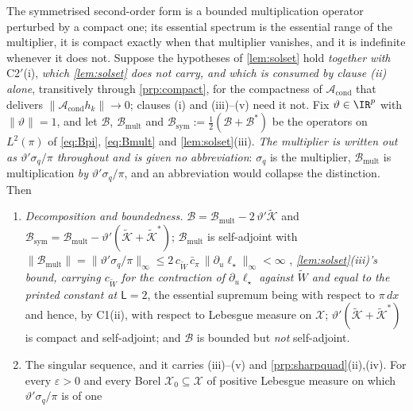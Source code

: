 \begin{lemma}\label{lem:formstruct}
The symmetrised second-order form is a bounded multiplication operator perturbed by a compact one; its
essential spectrum is the essential range of the multiplier, it is compact exactly when that multiplier
vanishes, and it is indefinite whenever it does not.
Suppose the hypotheses of \cref{lem:solset} hold \emph{together with} C2$'$(i), \emph{which
\cref{lem:solset} does not carry, and which is consumed by clause \textup{(ii)} alone}, transitively
through \cref{prp:compact}, for the compactness of $\mathcal A_{\mathrm{cond}}$ that delivers
$\|\mathcal A_{\mathrm{cond}}h_k\|\to0$; clauses \textup{(i)} and \textup{(iii)}--\textup{(v)} need it
not. Fix $\vartheta\in\IR^{p}$ with $\|\vartheta\|=1$, and
let $\mathcal B$, $\mathcal B_{\mathrm{mult}}$ and
$\mathcal B_{\mathrm{sym}}:=\tfrac12(\mathcal B+\mathcal B^{\ast})$ be the operators on $L^{2}(\pi)$ of
\eqref{eq:Bpi}, \eqref{eq:Bmult} and \cref{lem:solset}(iii). \emph{The multiplier is written out as
$\vartheta'\sigma_q/\pi$ throughout and is given no abbreviation}: $\sigma_q$ is the multiplier,
$\mathcal B_{\mathrm{mult}}$ is multiplication \emph{by} $\vartheta'\sigma_q/\pi$, and an abbreviation
would collapse the distinction. Then
\begin{enumerate}
\item[(i)] \emph{Decomposition and boundedness.}
$\mathcal B=\mathcal B_{\mathrm{mult}}-2\,\vartheta'\tilde{\mathcal K}$ and
$\mathcal B_{\mathrm{sym}}=\mathcal B_{\mathrm{mult}}-\vartheta'(\tilde{\mathcal K}+\tilde{\mathcal K}^{\ast})$;
$\mathcal B_{\mathrm{mult}}$ is self-adjoint with
$\|\mathcal B_{\mathrm{mult}}\|=\|\vartheta'\sigma_q/\pi\|_\infty\le2\,c_{\widetilde W}\,\bar c_\pi\,\|\partial_u\ell_\star\|_\infty<\infty$
, \emph{\cref{lem:solset}\textup{(iii)}'s bound, carrying $c_{\widetilde W}$ for the contraction
of $\partial_u\ell_\star$ against $\widetilde W$ and equal to the printed constant at $\mathsf L=2$}, 
the essential supremum being with respect to $\pi\,dx$ and hence, by C1(ii), with respect to Lebesgue
measure on $\mathcal X$; $\vartheta'(\tilde{\mathcal K}+\tilde{\mathcal K}^{\ast})$ is compact and
self-adjoint; and $\mathcal B$ is bounded but \emph{not} self-adjoint.
\item[(ii)] The singular sequence, and it carries \textup{(iii)}--\textup{(v)} and
\cref{prp:sharpquad}\textup{(ii)},\textup{(iv)}. For every $\varepsilon>0$ and every Borel
$\mathcal X_0\subseteq\mathcal X$ of positive Lebesgue measure on which $\vartheta'\sigma_q/\pi$ is of one

\end{enumerate}
\end{lemma}
